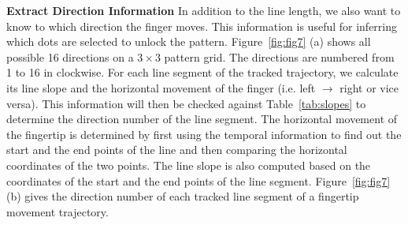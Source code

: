        \noindent \textbf{Extract Direction Information}
       In addition to the line length, we also want to know to which
       direction the finger moves. This information is useful for inferring which dots are selected to unlock the pattern.
       Figure~\ref{fig:fig7} (a) shows all possible 16
        directions on a $3 \times 3$ pattern grid. The
        directions are numbered from 1 to 16 in clockwise.
        For each line segment of the tracked trajectory, we calculate its line slope and the horizontal movement of the finger (i.e. left $\rightarrow$ right or vice versa).
        This information will then be checked against Table~\ref{tab:slopes} to determine the direction number of the line segment.
         The horizontal movement of the fingertip is determined by first using the temporal information to find out the start and the end points of the line and then comparing the horizontal coordinates of the two points.
        The line slope is also computed based on the coordinates of the
       start and the end points of the
        line segment.
        Figure~\ref{fig:fig7} (b) gives the direction number of each
        tracked line segment of a fingertip movement trajectory.

